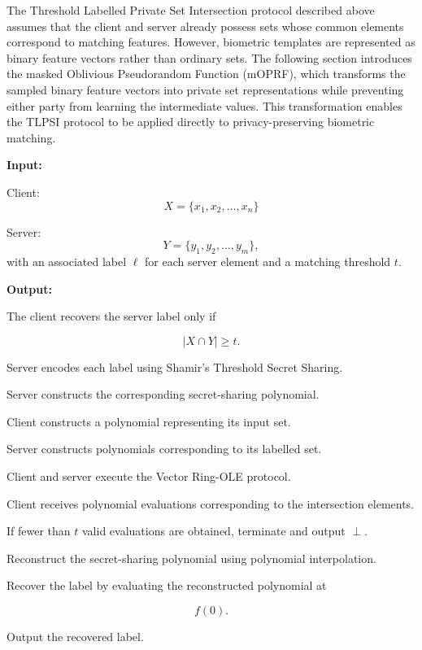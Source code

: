 \documentclass[11pt,a4paper]{article}
\begin{document}
The Threshold Labelled Private Set Intersection protocol described above assumes that the client and server already possess sets whose common elements correspond to matching features. However, biometric templates are represented as binary feature vectors rather than ordinary sets. The following section introduces the masked Oblivious Pseudorandom Function (mOPRF), which transforms the sampled binary feature vectors into private set representations while preventing either party from learning the intermediate values. This transformation enables the TLPSI protocol to be applied directly to privacy-preserving biometric matching.

\begin{algorithm}[H]
\caption{Threshold Labelled Private Set Intersection (TLPSI)}
\label{alg:tlpsi}

\textbf{Input:}

Client:
\[
X=\{x_1,x_2,\ldots,x_n\}
\]

Server:
\[
Y=\{y_1,y_2,\ldots,y_m\},
\]
with an associated label $\ell$ for each server element and a matching
threshold $t$.

\textbf{Output:}

The client recovers the server label only if

\[
|X\cap Y|\ge t.
\]

\begin{algorithmic}[1]

\State Server encodes each label using Shamir's Threshold Secret Sharing.

\State Server constructs the corresponding secret-sharing polynomial.

\State Client constructs a polynomial representing its input set.

\State Server constructs polynomials corresponding to its labelled set.

\State Client and server execute the Vector Ring-OLE protocol.

\State Client receives polynomial evaluations corresponding to the
intersection elements.

\State If fewer than $t$ valid evaluations are obtained,
    \Statex \hspace{\algorithmicindent} terminate and output $\perp$.

\State Reconstruct the secret-sharing polynomial using polynomial
interpolation.

\State Recover the label by evaluating the reconstructed polynomial at

\[
f(0).
\]

\State Output the recovered label.

\end{algorithmic}
\end{algorithm}
\end{document}

